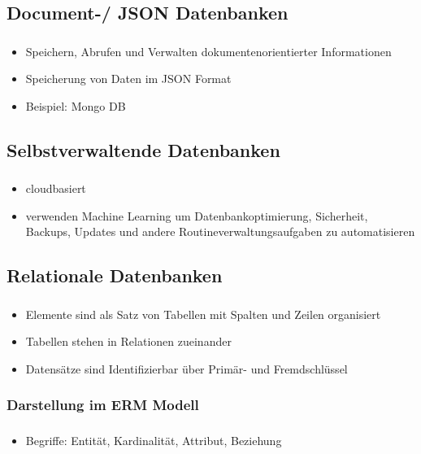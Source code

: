 \documentclass[aspectratio=169,14pt,xcolor=dvipsnames]{beamer}
\begin{document}
\subsection{Document-/ JSON Datenbanken}
\begin{frame}[t]
    \frametitle{\subsecname}
    \begin{itemize}
        \item Speichern, Abrufen und Verwalten dokumentenorientierter Informationen
        \item Speicherung von Daten im JSON Format
        \item Beispiel: Mongo DB
    \end{itemize}
\end{frame}

\subsection{Selbstverwaltende Datenbanken}
\begin{frame}[t]
    \frametitle{\subsecname}
    \begin{itemize}
        \item cloudbasiert
        \item verwenden Machine Learning um Datenbankoptimierung, Sicherheit, Backups, Updates und andere Routineverwaltungsaufgaben zu automatisieren
    \end{itemize}
\end{frame}

\subsection{Relationale Datenbanken}
\begin{frame}[t]
    \frametitle{\subsecname}
    \begin{itemize}
        \item Elemente sind als Satz von Tabellen mit Spalten und Zeilen organisiert
        \item Tabellen stehen in Relationen zueinander
        \item Datensätze sind Identifizierbar über Primär- und Fremdschlüssel
    \end{itemize}
\end{frame}

\subsubsection{Darstellung im ERM Modell}
\begin{frame}[t]
    \frametitle{\subsecname}
    \framesubtitle{\subsubsecname}
    \begin{itemize}
        \item Begriffe: Entität, Kardinalität, Attribut, Beziehung
    \end{itemize}
    
\end{frame}
\end{document}

